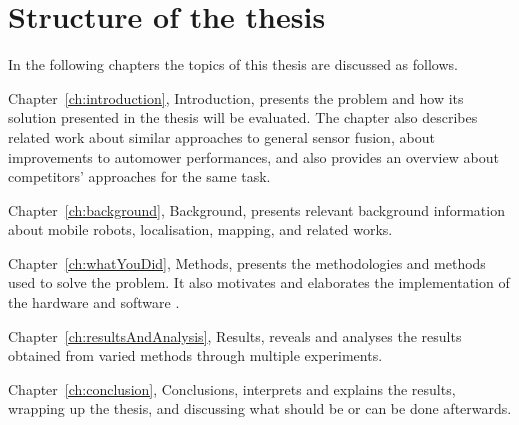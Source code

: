\section{Structure of the thesis}
\noindent In the following chapters the topics of this thesis are discussed as follows.

Chapter~\ref{ch:introduction}, Introduction, presents the problem and how its solution presented in the thesis will be evaluated.
The chapter also describes related work about similar approaches to general sensor fusion, about improvements to automower performances, and also provides an overview about competitors' approaches for the same task. 

Chapter~\ref{ch:background}, Background, presents relevant background information about mobile robots, localisation, mapping, and related works.

Chapter~\ref{ch:whatYouDid}, Methods, presents the methodologies and methods used to solve the problem. It also motivates and elaborates the implementation of the hardware and software .

Chapter~\ref{ch:resultsAndAnalysis}, Results, reveals and analyses the results obtained from varied methods through multiple experiments.

Chapter~\ref{ch:conclusion}, Conclusions, interprets and explains the results, wrapping up the thesis, and discussing what should be or can be done afterwards.


\cleardoublepage
